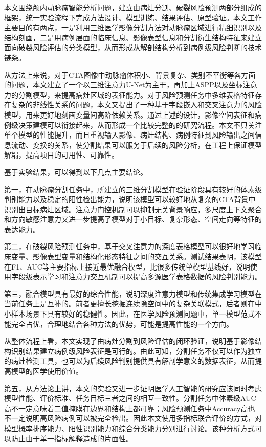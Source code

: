 
本文围绕颅内动脉瘤智能分析问题，建立由病灶分割、破裂风险预测两部分组成的框架，统一实验流程下完成方法设计、模型训练、结果评估、原型验证。本文工作主要目的有两点，一是利用三维医学影像分割方法对动脉瘤区域进行精细识别以及结构刻画，二是用病例层面的临床信息、影像表型信息和分割衍生结构特征来建立面向破裂风险评估的分类模型，从而形成从解剖结构分析到病例级风险判断的技术链条。

从方法上来说，对于CTA图像中动脉瘤体积小、背景复杂、类别不平衡等各方面的问题，本文建立了一个以三维注意力U-Net为主干，再加上ASPP以及坐标注意力的分割模型，来提高病灶区域的表征能力。对于风险预测任务中多维表格特征存在复杂的非线性关系的问题，本文又提出了一种基于字段嵌入和交叉注意力的风险模型，用来更好地刻画变量间高阶依赖关系。通过上述的设计，影像空间表征和病例级决策建模可以衔接起来，从而形成一个比较完整的的研究流程。本文不只关注单个模型的性能提升，而且重视输入影像、病灶结构、病例特征到风险输出之间信息流动、变换的关系，使分割结果可以服务于后续的风险分析，在工程上保证模型解耦，提高项目的可用性、可靠性。


基于实验结果，可以得到以下几点主要结论。

第一，在动脉瘤分割任务中，所建立的三维分割模型在验证阶段具有较好的体素级判别能力以及稳定的阳性检出能力，说明该模型可以较好地从复杂的CTA背景中识别出目标病灶区域。注意力门控机制可以抑制无关背景响应，多尺度上下文聚合和方向敏感注意力又进一步提高了模型对于小目标、复杂形态、空间走向等特征的表达能力。

第二，在破裂风险预测任务中，基于交叉注意力的深度表格模型可以很好地学习临床变量、影像表型变量和结构化形态特征之间的交互关系。测试结果表明，该模型在F1、AUC等主要指标上接近最优融合模型，比很多传统单模型基线好，说明使用字段级表示学习和注意力交互机制可以提高多源医学表格数据的风险判别能力。

第三，融合模型具有最好的综合性能，说明深度注意力模型和传统集成学习模型在当前任务上是互补的。前者更擅长挖掘连续隐空间中的复杂关联模式，后者则在中小样本场景下具有较好的稳健性。因此，在医学风险预测问题中，单一模型范式不能完全占优，合理地结合各种方法的优势，可能是提高性能的一个方向。

从整体流程上看，本文实现了由病灶分割到风险评估的闭环验证，说明基于影像结构识别结果建立病例级风险表征是可行的。由此可知，分割任务不仅可以作为独立的病灶检测工具，也可以为后续风险判别提供具有解剖学意义的数据表征，从而提高模型的医学使用价值。

第五，从方法论上讲，本文的实验又进一步证明医学人工智能的研究应该同时考虑模型性能、评价标准、任务目标三者之间的相互一致性。分割任务中体素级AUC高不一定意味着二值掩膜在边界和结构上都可靠；风险预测任务中Accuracy高也不一定说明高风险病例可以被完全检出。因此本文使用多指标联合评价的方式，对模型概率排序能力、阳性识别能力和综合分类能力分别进行讨论。该种分析方式可以防止由于单一指标解释造成的片面性。

